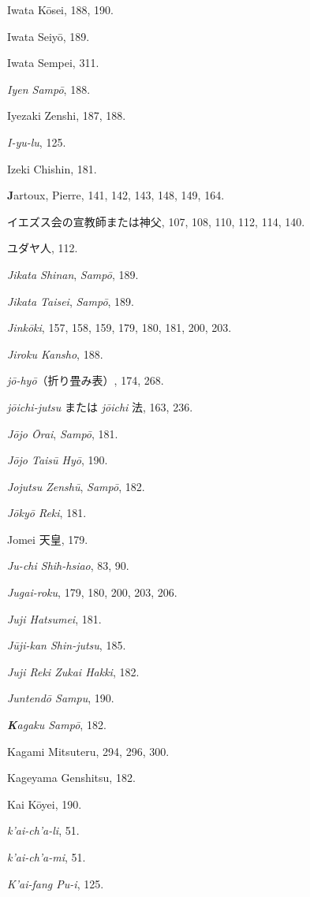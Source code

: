\documentclass[11pt]{article}
\newcommand{\scanpage}[2]{\clearpage\setcounter{footnote}{0}\noindent{\footnotesize\color{gray}PDF #1 頁 · #2}\par\medskip}
\begin{document}
\scanpage{0351}{印刷頁 337}
Iwata Kōsei, 188, 190.\par
Iwata Seiyō, 189.\par
Iwata Sempei, 311.\par
\emph{Iyen Sampō}, 188.\par
Iyezaki Zenshi, 187, 188.\par
\emph{I-yu-lu}, 125.\par
Izeki Chishin, 181.\par
\medskip
\textbf{J}artoux, Pierre, 141, 142, 143, 148, 149, 164.\par
イエズス会の宣教師または神父, 107, 108, 110, 112, 114, 140.\par
ユダヤ人, 112.\par
\emph{Jikata Shinan}, \emph{Sampō}, 189.\par
\emph{Jikata Taisei}, \emph{Sampō}, 189.\par
\emph{Jinkōki}, 157, 158, 159, 179, 180, 181, 200, 203.\par
\emph{Jiroku Kansho}, 188.\par
\emph{jō-hyō}（折り畳み表）, 174, 268.\par
\emph{jōichi-jutsu} または \emph{jōichi} 法, 163, 236.\par
\emph{Jōjo Ōrai}, \emph{Sampō}, 181.\par
\emph{Jōjo Taisū Hyō}, 190.\par
\emph{Jojutsu Zenshū}, \emph{Sampō}, 182.\par
\emph{Jōkyō Reki}, 181.\par
Jomei 天皇, 179.\par
\emph{Ju-chi Shih-hsiao}, 83, 90.\par
\emph{Jugai-roku}, 179, 180, 200, 203, 206.\par
\emph{Juji Hatsumei}, 181.\par
\emph{Jūji-kan Shin-jutsu}, 185.\par
\emph{Juji Reki Zukai Hakki}, 182.\par
\emph{Juntendō Sampu}, 190.\par
\medskip
\emph{\textbf{K}agaku Sampō}, 182.\par
Kagami Mitsuteru, 294, 296, 300.\par
Kageyama Genshitsu, 182.\par
Kai Kōyei, 190.\par
\emph{k'ai-ch'a-li}, 51.\par
\emph{k'ai-ch'a-mi}, 51.\par
\emph{K'ai-fang Pu-i}, 125.\par
\end{document}
